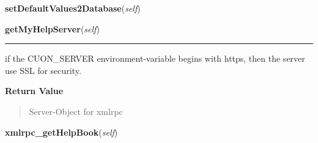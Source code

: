     \label{cuon:Misc:Misc:setDefaultValues2Database}

    \vspace{0.5ex}

\hspace{.8\funcindent}\begin{boxedminipage}{\funcwidth}

    \raggedright \textbf{setDefaultValues2Database}(\textit{self})

\setlength{\parskip}{2ex}
\setlength{\parskip}{1ex}
    \end{boxedminipage}

    \label{cuon:Misc:Misc:getMyHelpServer}

    \vspace{0.5ex}

\hspace{.8\funcindent}\begin{boxedminipage}{\funcwidth}

    \raggedright \textbf{getMyHelpServer}(\textit{self})

    \vspace{-1.5ex}

    \rule{\textwidth}{0.5\fboxrule}
\setlength{\parskip}{2ex}
    if the CUON\_SERVER environment-variable begins with https, then the 
    server use SSL for security.

\setlength{\parskip}{1ex}
      \textbf{Return Value}
    \vspace{-1ex}

      \begin{quote}
      Server-Object for xmlrpc

      \end{quote}

    \end{boxedminipage}

    \label{cuon:Misc:Misc:xmlrpc_getHelpBook}

    \vspace{0.5ex}

\hspace{.8\funcindent}\begin{boxedminipage}{\funcwidth}

    \raggedright \textbf{xmlrpc\_getHelpBook}(\textit{self})

\setlength{\parskip}{2ex}
\setlength{\parskip}{1ex}
    \end{boxedminipage}

